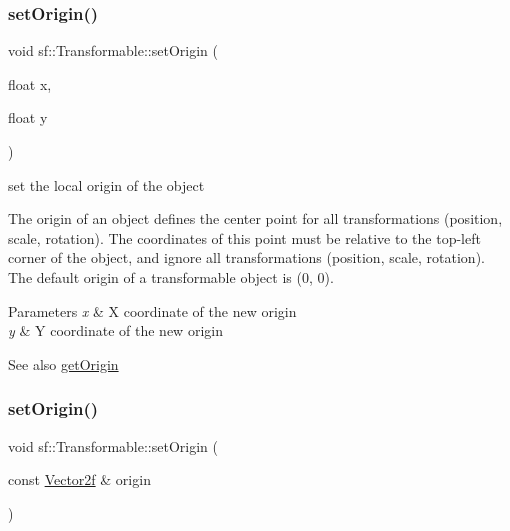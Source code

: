 \subsubsection{\texorpdfstring{setOrigin()}{setOrigin()}\hspace{0.1cm}{\footnotesize\ttfamily [1/2]}}
{\footnotesize\ttfamily void sf\+::\+Transformable\+::set\+Origin (\begin{DoxyParamCaption}\item[{float}]{x,  }\item[{float}]{y }\end{DoxyParamCaption})}



set the local origin of the object 

The origin of an object defines the center point for all transformations (position, scale, rotation). The coordinates of this point must be relative to the top-\/left corner of the object, and ignore all transformations (position, scale, rotation). The default origin of a transformable object is (0, 0).


\begin{DoxyParams}{Parameters}
{\em x} & X coordinate of the new origin \\
\hline
{\em y} & Y coordinate of the new origin\\
\hline
\end{DoxyParams}
\begin{DoxySeeAlso}{See also}
\mbox{\hyperlink{classsf_1_1_transformable_a37ea3500afac234814a43ce809ef264e}{get\+Origin}} \begin{DoxyVerb}\end{DoxyVerb}
 
\end{DoxySeeAlso}
\mbox{\label{classsf_1_1_transformable_aa93a835ffbf3bee2098dfbbc695a7f05}} 
\subsubsection{\texorpdfstring{setOrigin()}{setOrigin()}\hspace{0.1cm}{\footnotesize\ttfamily [2/2]}}
{\footnotesize\ttfamily void sf\+::\+Transformable\+::set\+Origin (\begin{DoxyParamCaption}\item[{const \mbox{\hyperlink{classsf_1_1_vector2}{Vector2f}} \&}]{origin }\end{DoxyParamCaption})}



